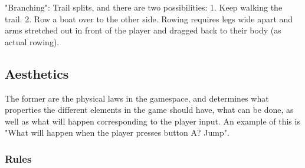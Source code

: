 "Branching": Trail splits, and there are two possibilities: 1. Keep walking the trail. 2. Row a boat over to the other side. Rowing requires legs wide apart and arms stretched out in front of the player and dragged back to their body (as actual rowing). 

\subsection{Aesthetics}

The former are the physical laws in the gamespace, and determines what properties the different elements in the game should have, what can be done, as well as what will happen corresponding to the player input. An example of this is "What will happen when the player presses button A? Jump".

\subsubsection{Rules} 
 
